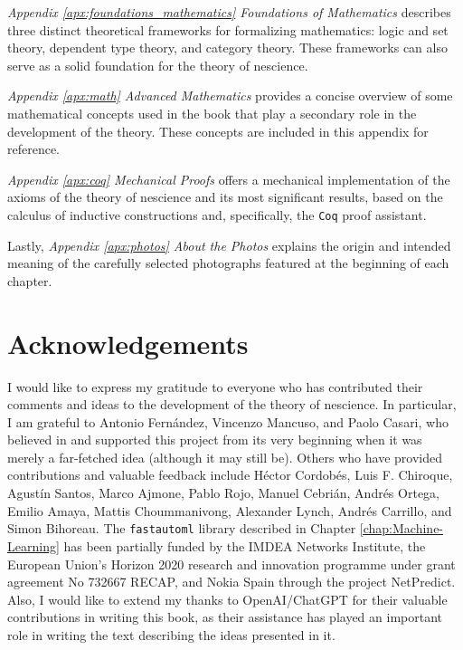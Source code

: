 \bigskip

\emph{Appendix \ref{apx:foundations_mathematics} Foundations of Mathematics} describes three distinct theoretical frameworks for formalizing mathematics: logic and set theory, dependent type theory, and category theory. These frameworks can also serve as a solid foundation for the theory of nescience.

\emph{Appendix \ref{apx:math} Advanced Mathematics} provides a concise overview of some mathematical concepts used in the book that play a secondary role in the development of the theory. These concepts are included in this appendix for reference.

\emph{Appendix \ref{apx:coq} Mechanical Proofs} offers a mechanical implementation of the axioms of the theory of nescience and its most significant results, based on the calculus of inductive constructions and, specifically, the \texttt{Coq} proof assistant.

Lastly, \emph{Appendix \ref{apx:photos} About the Photos} explains the origin and intended meaning of the carefully selected photographs featured at the beginning of each chapter.

%
%

\section*{Acknowledgements}

I would like to express my gratitude to everyone who has contributed their comments and ideas to the development of the theory of nescience. In particular, I am grateful to Antonio Fernández, Vincenzo Mancuso, and Paolo Casari, who believed in and supported this project from its very beginning when it was merely a far-fetched idea (although it may still be). Others who have provided contributions and valuable feedback include Héctor Cordobés, Luis F. Chiroque, Agustín Santos, Marco Ajmone, Pablo Rojo, Manuel Cebrián, Andrés Ortega, Emilio Amaya, Mattis Choummanivong, Alexander Lynch, Andrés Carrillo, and Simon Bihoreau. The \texttt{fastautoml} library described in Chapter \ref{chap:Machine-Learning} has been partially funded by the IMDEA Networks Institute, the European Union's Horizon 2020 research and innovation programme under grant agreement No 732667 RECAP, and Nokia Spain through the project NetPredict. Also, I would like to extend my thanks to OpenAI/ChatGPT for their valuable contributions in writing this book, as their assistance has played an important role in writing the text describing the ideas presented in it.

